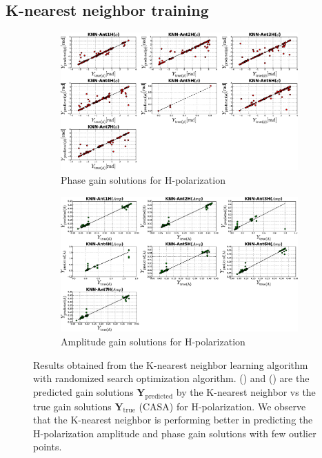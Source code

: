 \subsection{K-nearest neighbor training}
\begin{figure}[H]
   \centering
    \begin{subfigure}[t]{0.52\textheight}
        
        \includegraphics[width=\textwidth]{images/KNNHphase.eps} 
        \caption{Phase gain solutions for H-polarization} \label{A4}
    \end{subfigure}
    
      \begin{subfigure}[t]{0.52\textheight}
       
        \includegraphics[width=\textwidth]{images/KNNHamp.eps} 
        \caption{Amplitude gain solutions for H-polarization} \label{B4}
    \end{subfigure}
    \caption{Results obtained from the K-nearest neighbor learning algorithm with randomized search optimization algorithm. () and () are the predicted gain solutions $\textbf{Y}_\mathrm{predicted}$ by the K-nearest neighbor vs the true gain solutions $\textbf{Y}_\mathrm{true}$ (CASA) for H-polarization. We observe that the K-nearest neighbor is performing better in predicting the H-polarization amplitude and phase gain solutions with few outlier points.}
    \label{BB4}
    \end{figure}
    
